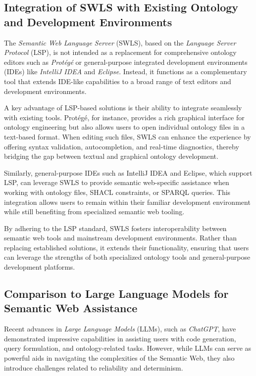 \subsection{Integration of SWLS with Existing Ontology and Development Environments}

The \textit{Semantic Web Language Server} (SWLS), based on the \textit{Language Server Protocol} (LSP), is not intended as a replacement for comprehensive ontology editors such as \textit{Protégé} or general-purpose integrated development environments (IDEs) like \textit{IntelliJ IDEA} and \textit{Eclipse}.
Instead, it functions as a complementary tool that extends IDE-like capabilities to a broad range of text editors and development environments.

A key advantage of LSP-based solutions is their ability to integrate seamlessly with existing tools.
Protégé, for instance, provides a rich graphical interface for ontology engineering but also allows users to open individual ontology files in a text-based format.
When editing such files, SWLS can enhance the experience by offering syntax validation, autocompletion, and real-time diagnostics, 
thereby bridging the gap between textual and graphical ontology development.

Similarly, general-purpose IDEs such as IntelliJ IDEA and Eclipse, which support LSP, can leverage SWLS to provide semantic web-specific assistance when working with ontology files, SHACL constraints, or SPARQL queries. 
This integration allows users to remain within their familiar development environment while still benefiting from specialized semantic web tooling.

By adhering to the LSP standard, SWLS fosters interoperability between semantic web tools and mainstream development environments. 
Rather than replacing established solutions, it extends their functionality, ensuring that users can leverage the strengths of both specialized ontology tools and general-purpose development platforms.


\subsection{Comparison to Large Language Models for Semantic Web Assistance}

Recent advances in \textit{Large Language Models} (LLMs), such as \textit{ChatGPT}, have demonstrated impressive capabilities in assisting users with code generation, query formulation, and ontology-related tasks. 
However, while LLMs can serve as powerful aids in navigating the complexities of the Semantic Web, they also introduce challenges related to reliability and determinism.  

